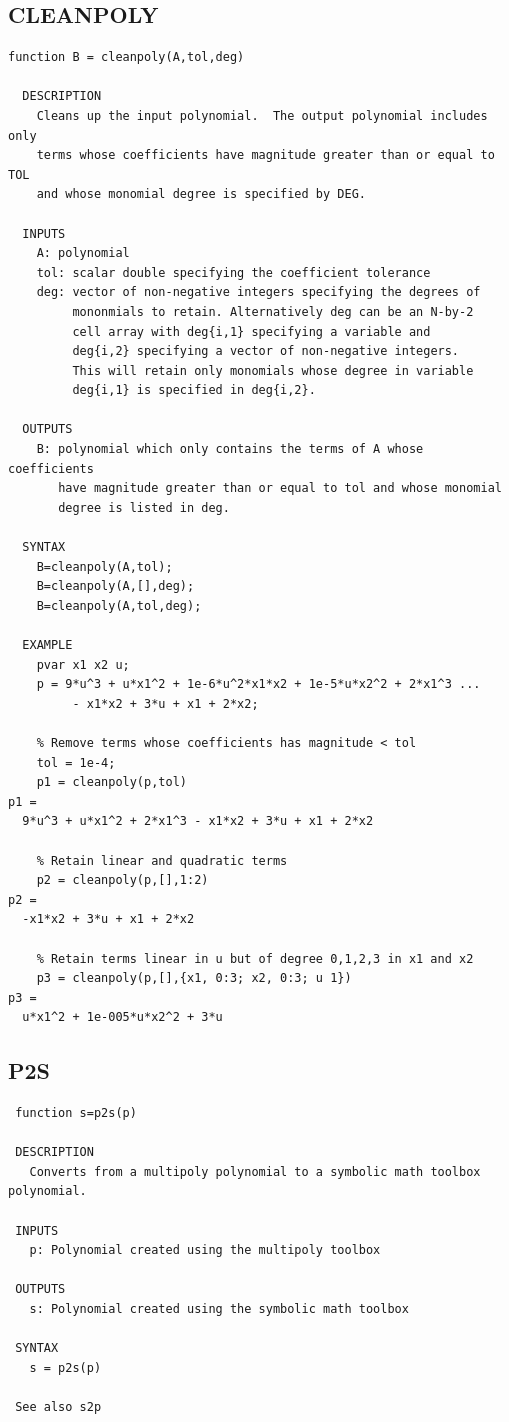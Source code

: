 \documentclass{article}
\begin{document}
\subsection{CLEANPOLY}
\begin{verbatim}
function B = cleanpoly(A,tol,deg)

  DESCRIPTION
    Cleans up the input polynomial.  The output polynomial includes only
    terms whose coefficients have magnitude greater than or equal to TOL
    and whose monomial degree is specified by DEG.

  INPUTS
    A: polynomial
    tol: scalar double specifying the coefficient tolerance
    deg: vector of non-negative integers specifying the degrees of
         mononmials to retain. Alternatively deg can be an N-by-2
         cell array with deg{i,1} specifying a variable and
         deg{i,2} specifying a vector of non-negative integers.
         This will retain only monomials whose degree in variable
         deg{i,1} is specified in deg{i,2}.

  OUTPUTS
    B: polynomial which only contains the terms of A whose coefficients
       have magnitude greater than or equal to tol and whose monomial
       degree is listed in deg.

  SYNTAX
    B=cleanpoly(A,tol);
    B=cleanpoly(A,[],deg);
    B=cleanpoly(A,tol,deg);

  EXAMPLE
    pvar x1 x2 u;
    p = 9*u^3 + u*x1^2 + 1e-6*u^2*x1*x2 + 1e-5*u*x2^2 + 2*x1^3 ...
         - x1*x2 + 3*u + x1 + 2*x2;

    % Remove terms whose coefficients has magnitude < tol
    tol = 1e-4;
    p1 = cleanpoly(p,tol)
p1 =
  9*u^3 + u*x1^2 + 2*x1^3 - x1*x2 + 3*u + x1 + 2*x2

    % Retain linear and quadratic terms
    p2 = cleanpoly(p,[],1:2)
p2 =
  -x1*x2 + 3*u + x1 + 2*x2

    % Retain terms linear in u but of degree 0,1,2,3 in x1 and x2
    p3 = cleanpoly(p,[],{x1, 0:3; x2, 0:3; u 1})
p3 =
  u*x1^2 + 1e-005*u*x2^2 + 3*u

\end{verbatim}

\newpage
\subsection{P2S}
\begin{verbatim}
 function s=p2s(p)

 DESCRIPTION
   Converts from a multipoly polynomial to a symbolic math toolbox polynomial.

 INPUTS
   p: Polynomial created using the multipoly toolbox

 OUTPUTS
   s: Polynomial created using the symbolic math toolbox

 SYNTAX
   s = p2s(p)

 See also s2p
\end{verbatim}
\newpage
\end{document}

